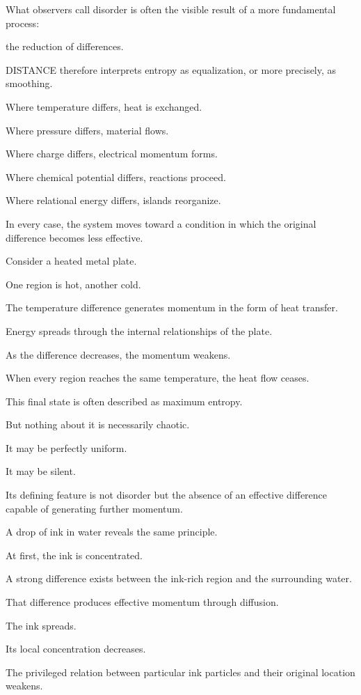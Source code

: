 What observers call disorder is often the visible result of a more fundamental process:

the reduction of differences.

DISTANCE therefore interprets entropy as equalization, or more precisely, as smoothing.

Where temperature differs, heat is exchanged.

Where pressure differs, material flows.

Where charge differs, electrical momentum forms.

Where chemical potential differs, reactions proceed.

Where relational energy differs, islands reorganize.

In every case, the system moves toward a condition in which the original difference becomes less effective.

Consider a heated metal plate.

One region is hot, another cold.

The temperature difference generates momentum in the form of heat transfer.

Energy spreads through the internal relationships of the plate.

As the difference decreases, the momentum weakens.

When every region reaches the same temperature, the heat flow ceases.

This final state is often described as maximum entropy.

But nothing about it is necessarily chaotic.

It may be perfectly uniform.

It may be silent.

Its defining feature is not disorder but the absence of an effective difference capable of generating further momentum.

A drop of ink in water reveals the same principle.

At first, the ink is concentrated.

A strong difference exists between the ink-rich region and the surrounding water.

That difference produces effective momentum through diffusion.

The ink spreads.

Its local concentration decreases.

The privileged relation between particular ink particles and their original location weakens.

